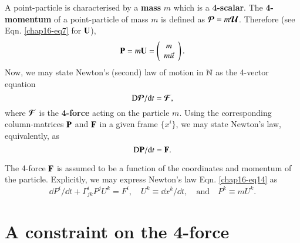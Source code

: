 A point-particle is characterised by a \textbf{mass} $m$ which is a \textbf{4-scalar}.  The \textbf{4-momentum} of a point-particle of mass  $m$ is defined  as $\bm{\mathcal{P}}=m\bm{\mathcal{U}}$. Therefore (see Eqn. \eqref{chap16-eq7} for ${\mathbf{U}}$),
\setcounter{equation}{11}
\begin{equation}
{\mathbf{P}}=m{\mathbf{U}}=\left(\begin{array}{c}m \\ m\vec{u}\end{array}\right).\label{chap16-eq12}
\end{equation}
Now, we may state Newton's (second) law of motion in $\mathbb{N}$ as the 4-vector equation 
\begin{equation}
{{\mathrm{D}}}\bm{\mathcal{P}}/\mathrm{d} t=\bm{\mathcal{F}},\label{chap16-eq13}
\end{equation}
where $\bm{\mathcal{F}}$ is the \textbf{4-force} acting on the particle $m$. Using the  corresponding column-matrices $\mathbf{P}$ and $\mathbf{F}$ in a given frame $\{x^i\}$, we may state Newton's law,  equivalently, as
\begin{equation}
{\mathrm{D}}{\mathbf{P}}/\mathrm{d} t={\mathbf{F}}.\label{chap16-eq14}
\end{equation}

The 4-force $\mathbf{F}$ is assumed to be a function of the coordinates and momentum of the particle. Explicitly, we may express  Newton's law Eqn. \eqref{chap16-eq14}  as 
\begin{equation}
\dd P^i /\dd t + \Gamma^i_{jk}P^j U^k=F^i, \quad  U^k \equiv \dd x^k/\dd  t, \quad \text{and} \quad P^k \equiv m U^k.\label{chap16-eq15}
\end{equation}

\section{A  constraint on the 4-force}\label{chap16-sec5}

